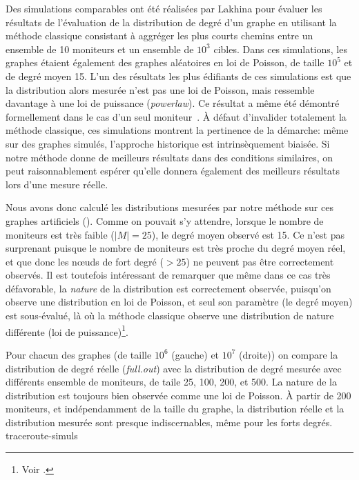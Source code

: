 Des simulations comparables ont été réalisées par Lakhina \etal
\cite{LakhinaBCX03} pour évaluer les résultats de l'évaluation de la
distribution de degré d'un graphe en utilisant la méthode classique consistant à
aggréger les plus courts chemins entre un ensemble de 10 moniteurs et un
ensemble de $10^3$ cibles. Dans ces simulations, les graphes étaient également
des graphes aléatoires en loi de Poisson, de taille $10^5$ et de degré moyen 15.
L'un des résultats les plus édifiants de ces simulations est que la distribution
alors mesurée n'est pas une loi de Poisson, mais ressemble davantage à une loi
de puissance ({\em powerlaw}). Ce résultat a même été démontré formellement dans
le cas d'un seul moniteur~\cite{AchlioptasCKM09}. À défaut d'invalider
totalement la méthode classique, ces simulations montrent la pertinence de la
démarche: même sur des graphes simulés, l'approche historique est
intrinsèquement biaisée. Si notre méthode donne de meilleurs résultats dans des
conditions similaires, on peut raisonnablement espérer qu'elle donnera également
des meilleurs résultats lors d'une mesure réelle.

Nous avons donc calculé les distributions mesurées par notre méthode sur ces
graphes artificiels (). Comme on pouvait s'y attendre,
lorsque le nombre de moniteurs est très faible ($|M| = 25$), le degré moyen
observé est 15. Ce n'est pas surprenant puisque le nombre de moniteurs est très
proche du degré moyen réel, et que donc les n\oe{}uds de fort degré ($> 25$) ne
peuvent pas être correctement observés. Il est toutefois intéressant de
remarquer que même dans ce cas très défavorable, la {\em nature} de la
distribution est correctement observée, puisqu'on observe une distribution en
loi de Poisson, et seul son paramètre (le degré moyen) est sous-évalué, là où la
méthode classique observe une distribution de nature différente (loi de
puissance)\footnote{Voir \cite{LakhinaBCX03}.}.

 {Pour chacun
des graphes (de taille $10^6$ (gauche) et $10^7$ (droite)) on compare la distribution de degré réelle
({\em full.out}) avec la distribution de degré mesurée avec différents ensemble
de moniteurs, de taile 25, 100, 200, et 500. La nature de la distribution est toujours bien
observée comme une loi de Poisson. À partir de 200 moniteurs, et indépendamment
de la taille du graphe, la distribution réelle et la distribution mesurée sont
presque indiscernables, même pour les forts degrés.} {traceroute-simuls}

